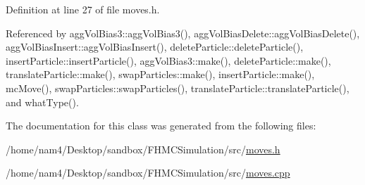 Definition at line 27 of file moves.\-h.



Referenced by agg\-Vol\-Bias3\-::agg\-Vol\-Bias3(), agg\-Vol\-Bias\-Delete\-::agg\-Vol\-Bias\-Delete(), agg\-Vol\-Bias\-Insert\-::agg\-Vol\-Bias\-Insert(), delete\-Particle\-::delete\-Particle(), insert\-Particle\-::insert\-Particle(), agg\-Vol\-Bias3\-::make(), delete\-Particle\-::make(), translate\-Particle\-::make(), swap\-Particles\-::make(), insert\-Particle\-::make(), mc\-Move(), swap\-Particles\-::swap\-Particles(), translate\-Particle\-::translate\-Particle(), and what\-Type().



The documentation for this class was generated from the following files\-:\begin{DoxyCompactItemize}
\item 
/home/nam4/\-Desktop/sandbox/\-F\-H\-M\-C\-Simulation/src/\hyperlink{moves_8h}{moves.\-h}\item 
/home/nam4/\-Desktop/sandbox/\-F\-H\-M\-C\-Simulation/src/\hyperlink{moves_8cpp}{moves.\-cpp}\end{DoxyCompactItemize}

